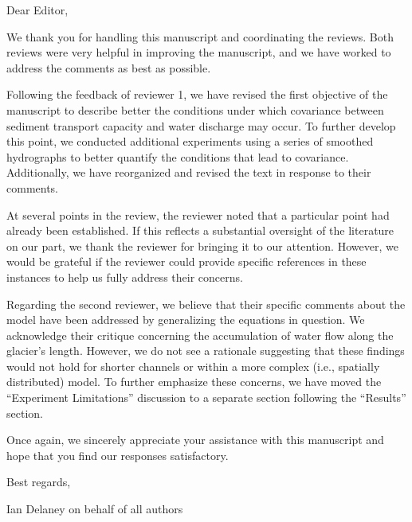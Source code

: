 \documentclass[11pt]{article}
\title{}
\author{}
\begin{document}
Dear Editor,

\vspace{.2cm}

We thank you for handling this manuscript and coordinating the reviews. Both reviews were very helpful in improving the manuscript, and we have worked to address the comments as best as possible.

\vspace{.2cm}

Following the feedback of reviewer 1, we have revised the first objective of the manuscript to describe better the conditions under which covariance between sediment transport capacity and water discharge may occur. To further develop this point, we conducted additional experiments using a series of smoothed hydrographs to better quantify the conditions that lead to covariance. Additionally, we have reorganized and revised the text in response to their comments. 

At several points in the review, the reviewer noted that a particular point had already been established. If this reflects a substantial oversight of the literature on our part, we thank the reviewer for bringing it to our attention. However, we would be grateful if the reviewer could provide specific references in these instances to help us fully address their concerns.

\vspace{.2cm}

Regarding the second reviewer, we believe that their specific comments about the model have been addressed by generalizing the equations in question. We acknowledge their critique concerning the accumulation of water flow along the glacier’s length. However, we do not see a rationale suggesting that these findings would not hold for shorter channels or within a more complex (i.e., spatially distributed) model. To further emphasize these concerns, we have moved the ``Experiment Limitations'' discussion to a separate section following the ``Results'' section.

\vspace{.2cm}

Once again, we sincerely appreciate your assistance with this manuscript and hope that you find our responses satisfactory.

\vspace{.5cm}

Best regards,

\vspace{.75cm}

Ian Delaney on behalf of all authors
\end{document}
